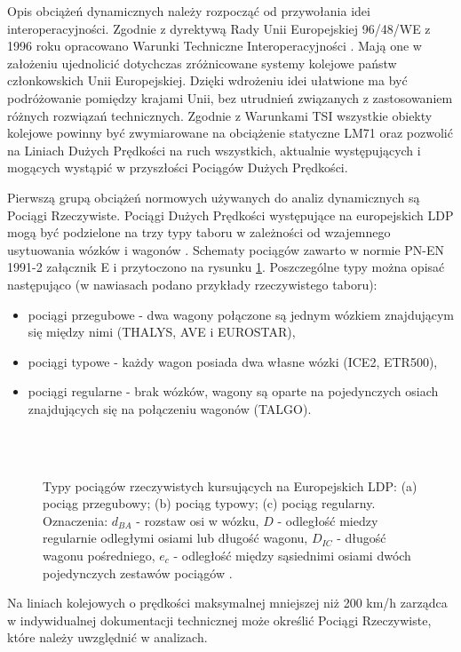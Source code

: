 Opis obciążeń dynamicznych należy rozpocząć od przywołania idei interoperacyjności. Zgodnie z dyrektywą Rady Unii Europejskiej 96/48/WE z 1996 roku opracowano Warunki Techniczne Interoperacyjności  \parencite{Muncke2008}. Mają one w założeniu ujednolicić dotychczas zróżnicowane systemy kolejowe państw członkowskich Unii Europejskiej. Dzięki wdrożeniu idei ułatwione ma być podróżowanie pomiędzy krajami Unii, bez utrudnień związanych z zastosowaniem różnych rozwiązań technicznych. Zgodnie z Warunkami TSI wszystkie obiekty kolejowe powinny być zwymiarowane na obciążenie statyczne LM71 oraz pozwolić na Liniach Dużych Prędkości na ruch wszystkich, aktualnie występujących i mogących wystąpić w przyszłości Pociągów Dużych Prędkości.

Pierwszą grupą obciążeń normowych używanych do analiz dynamicznych są Pociągi Rzeczywiste. Pociągi Dużych Prędkości występujące na europejskich LDP mogą być podzielone na trzy typy taboru w zależności od wzajemnego usytuowania wózków i wagonów \parencite{Goicolea2008a}. Schematy pociągów zawarto w normie PN-EN 1991-2 załącznik E i przytoczono na rysunku \ref{fig:train_types_EC}. Poszczególne typy można opisać następująco (w nawiasach podano przykłady rzeczywistego taboru):
\begin{itemize} 
	\item pociągi przegubowe - dwa wagony połączone są jednym wózkiem znajdującym się między nimi (THALYS, AVE i EUROSTAR),
	\item pociągi typowe - każdy wagon posiada dwa własne wózki (ICE2, ETR500),
	\item pociągi regularne - brak wózków, wagony są oparte na pojedynczych osiach znajdujących się na połączeniu wagonów (TALGO).
\end{itemize}
\begin{figure}[hbt!]
	\centering
	 \\
	 \\
	\captionsetup{justification=centering}
	\caption{Typy pociągów rzeczywistych kursujących na Europejskich LDP: (a) pociąg przegubowy; (b) pociąg typowy; (c) pociąg regularny. Oznaczenia: $d_{BA}$ - rozstaw osi w wózku, $D$ - odległość miedzy regularnie odległymi osiami lub długość wagonu, $D_{IC}$ - długość wagonu pośredniego, $e_c$ - odległość między sąsiednimi osiami dwóch pojedynczych zestawów pociągów \parencite{PKNj}.}
	\label{fig:train_types_EC}
\end{figure}
Na liniach kolejowych o prędkości maksymalnej mniejszej niż 200 km/h zarządca w indywidualnej dokumentacji technicznej może określić Pociągi Rzeczywiste, które należy uwzględnić w analizach.

